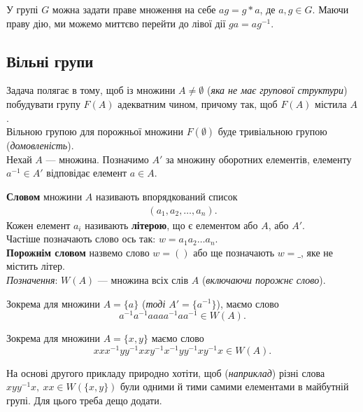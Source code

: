 \documentclass{math_library}
\begin{document}
\begin{remark}
У групі $G$ можна задати праве множення на себе $ag = g*a$, де $a,g \in G$. Маючи праву дію, ми можемо миттєво перейти до лівої дії $ga = ag^{-1}$. 
\end{remark}

\subsection{Вільні групи}
Задача полягає в тому, щоб із множини $A \neq \emptyset$ (\textit{яка не має групової структури}) побудувати групу $F(A)$ адекватним чином, причому так, щоб $F(A)$ містила $A$.
\bigskip \\
Вільною групою для порожньої множини $F(\emptyset)$ буде тривіальною групою (\textit{домовленість}).
\bigskip \\
Нехай $A$ --- множина. Позначимо $A'$ за множину оборотних елементів, елементу $a^{-1} \in A'$ відповідає елемент $a \in A$.

\begin{definition}
\textbf{Словом} множини $A$ називають впорядкований список
\begin{align*}
(a_1,a_2,\dots,a_n).
\end{align*}
Кожен елемент $a_i$ називають \textbf{літерою}, що є елементом або $A$, або $A'$.\\  
Частіше позначають слово ось так: $w = a_1a_2 \dots a_n$.
\bigskip \\
\textbf{Порожнім словом} назвемо слово $w = ()$ або ще позначають $w = \_$, яке не містить літер.
\bigskip \\
\textit{Позначення}: $W(A)$ --- множина всіх слів $A$ (\textit{включаючи порожнє слово}).
\end{definition}

\begin{example}
Зокрема для множини $A = \{a\}$ (\textit{тоді $A' = \{a^{-1}\}$}), маємо слово 
\[
a^{-1}a^{-1}aaaa^{-1}aa^{-1} \in W(A).
\]
\end{example}

\begin{example}
Зокрема для множини $A = \{x,y\}$ маємо слово 
\[
xxx^{-1}yy^{-1}xxy^{-1}x^{-1}yy^{-1}xy^{-1}x \in W(A).
\]
\end{example}

На основі другого прикладу природно хотіти, щоб (\textit{наприклад}) різні слова $xyy^{-1}x,\ xx \in W(\{x,y\})$ були одними й тими самими елементами в майбутній групі. Для цього треба дещо додати.
\end{document}
